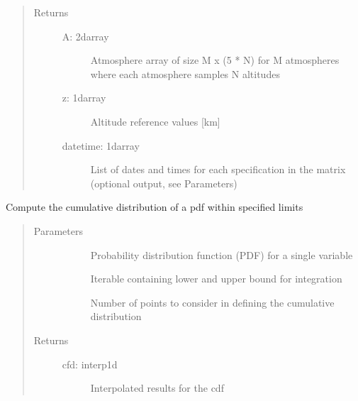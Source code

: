 \documentclass[letterpaper,10pt,english]{sphinxmanual}
\begin{document}
\begin{fulllineitems}
\begin{quote}
\begin{description}
\item[{Returns}] \leavevmode\begin{description}
\item[{A: 2darray}] \leavevmode
Atmosphere array of size M x (5 * N) for M atmospheres where each atmosphere samples N altitudes

\item[{z: 1darray}] \leavevmode
Altitude reference values {[}km{]}

\item[{datetime: 1darray}] \leavevmode
List of dates and times for each specification in the matrix (optional output, see Parameters)

\end{description}

\end{description}\end{quote}

\end{fulllineitems}


\begin{fulllineitems}
\label{\detokenize{stochprop.eofs:stochprop.eofs.build_cdf}}
Compute the cumulative distribution of a pdf within specified limits
\begin{quote}\begin{description}
\item[{Parameters}] \leavevmode\begin{description}
\item[{}] \leavevmode
Probability distribution function (PDF) for a single variable

\item[{}] \leavevmode
Iterable containing lower and upper bound for integration

\item[{}] \leavevmode
Number of points to consider in defining the cumulative distribution

\end{description}

\item[{Returns}] \leavevmode\begin{description}
\item[{cfd: interp1d}] \leavevmode
Interpolated results for the cdf

\end{description}

\end{description}\end{quote}

\end{fulllineitems}
\end{document}
